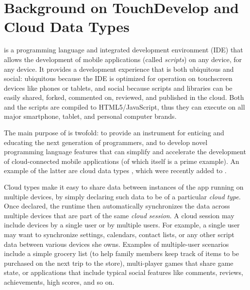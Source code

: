 \documentclass[preprint]{sigplanconf}
\begin{document}
\section{Background on TouchDevelop and Cloud Data Types}

\TD is a programming language and integrated development environment (IDE) that
allows the development of mobile applications (called \emph{scripts}) on any
device, for any device. 
It provides a development experience that is both ubiquitous and social:
ubiquitous because the IDE is optimized for operation on touchscreen devices
like phones or tablets, and social because scripts and libraries can be easily
shared, forked, commented on, reviewed, and published in the cloud.
Both \TD and the \TD scripts are compiled to HTML5/JavaScript, thus they can
execute on all major smartphone, tablet, and personal computer brands.  

The main purpose of \TD is twofold: to provide an instrument for enticing and educating the next generation of programmers, and to develop novel programming language features that can simplify and accelerate the development of cloud-connected mobile applications (of which \TD itself is a prime example). An example of the latter are cloud data types \cite{burckhardt2012cloud}, which were recently added to \TD. 

Cloud types make it easy to share data between instances of the app running on multiple devices, by simply declaring such data to be of a particular \emph{cloud type}. Once declared, the runtime then automatically synchronizes the data across multiple devices that are part of the same \emph{cloud session}. A cloud session may include devices by a single user or by multiple users.  For example, a single user may want to synchronize settings, calendars, contact lists, or any other script data between various devices she owns. Examples of multiple-user scenarios include a simple grocery list (to help family members keep track of items to be purchased on the next trip to the store), multi-player games that share game state, or applications that include typical social features like comments, reviews, achievements, high scores, and so on.
\end{document}
